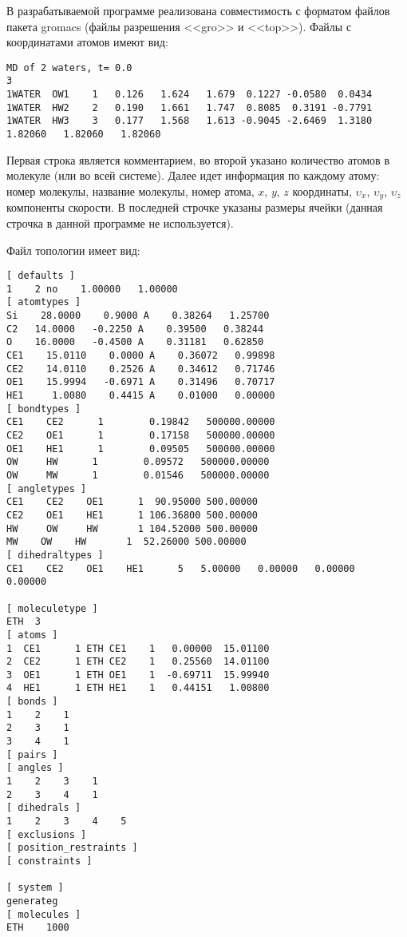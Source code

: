 В разрабатываемой программе реализована совместимость с форматом файлов пакета gromacs (файлы разрешения <<gro>> и  <<top>>). Файлы с координатами атомов имеют вид:
\begin{lstlisting}
MD of 2 waters, t= 0.0
3
1WATER  OW1    1   0.126   1.624   1.679  0.1227 -0.0580  0.0434
1WATER  HW2    2   0.190   1.661   1.747  0.8085  0.3191 -0.7791
1WATER  HW3    3   0.177   1.568   1.613 -0.9045 -2.6469  1.3180
1.82060   1.82060   1.82060
\end{lstlisting}

Первая строка является комментарием, во второй указано количество атомов в молекуле (или во всей системе). Далее идет информация по каждому атому: номер молекулы, название молекулы, номер атома, $x$, $y$, $z$ координаты, $\upsilon_x$,  $\upsilon_y$, $\upsilon_z$ компоненты скорости. В последней строчке указаны размеры ячейки (данная строчка в данной программе не используется).

Файл топологии имеет вид:
\begin{lstlisting}
[ defaults ]
1    2 no    1.00000   1.00000
[ atomtypes ]
Si    28.0000    0.9000 A    0.38264   1.25700
C2   14.0000   -0.2250 A    0.39500   0.38244
O    16.0000   -0.4500 A    0.31181   0.62850
CE1    15.0110    0.0000 A    0.36072   0.99898
CE2    14.0110    0.2526 A    0.34612   0.71746
OE1    15.9994   -0.6971 A    0.31496   0.70717
HE1     1.0080    0.4415 A    0.01000   0.00000
[ bondtypes ]
CE1    CE2      1        0.19842   500000.00000
CE2    OE1      1        0.17158   500000.00000
OE1    HE1      1        0.09505   500000.00000
OW     HW      1        0.09572   500000.00000
OW     MW      1        0.01546   500000.00000
[ angletypes ]
CE1    CE2    OE1      1  90.95000 500.00000
CE2    OE1    HE1      1 106.36800 500.00000
HW     OW     HW       1 104.52000 500.00000
MW    OW    HW       1  52.26000 500.00000
[ dihedraltypes ]
CE1    CE2    OE1    HE1      5   5.00000   0.00000   0.00000   0.00000

[ moleculetype ]
ETH  3
[ atoms ]
1  CE1      1 ETH CE1    1   0.00000  15.01100
2  CE2      1 ETH CE2    1   0.25560  14.01100
3  OE1      1 ETH OE1    1  -0.69711  15.99940
4  HE1      1 ETH HE1    1   0.44151   1.00800
[ bonds ]
1    2    1
2    3    1
3    4    1
[ pairs ]
[ angles ]
1    2    3    1
2    3    4    1
[ dihedrals ]
1    2    3    4    5
[ exclusions ]
[ position_restraints ]
[ constraints ]

[ system ]
generateg
[ molecules ]
ETH    1000
\end{lstlisting}

